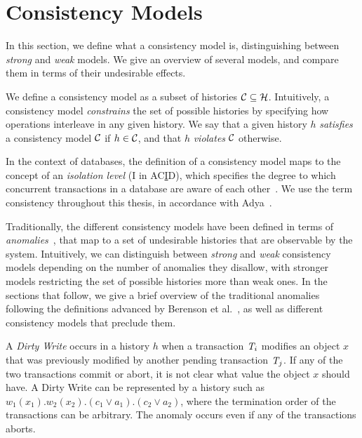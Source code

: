 \section{Consistency Models}

In this section, we define what a consistency model is, distinguishing between \emph{strong} and \emph{weak} models. We give an overview of several models, and compare them in terms of their undesirable effects.

We define a consistency model as a subset of histories $\mathcal{C} \subseteq \mathcal{H}$. Intuitively, a consistency model \emph{constrains} the set of possible histories by specifying how operations interleave in any given history. We say that a given history $h$ \emph{satisfies} a consistency model $\mathcal{C}$ if $h \in \mathcal{C}$, and that $h$ \emph{violates} $\mathcal{C}$ otherwise.

In the context of databases, the definition of a consistency model maps to the concept of an \emph{isolation level} (I in AC\underline{I}D), which specifies the degree to which concurrent transactions in a database are aware of each other~\citep{adya_thesis}. We use the term consistency throughout this thesis, in accordance with Adya~\citep{adya_thesis}.

Traditionally, the different consistency models have been defined in terms of \emph{anomalies}~\citep{sql-critique}, that map to a set of undesirable histories that are observable by the system. Intuitively, we can distinguish between \emph{strong} and \emph{weak} consistency models depending on the number of anomalies they disallow, with stronger models restricting the set of possible histories more than weak ones. In the sections that follow, we give a brief overview of the traditional anomalies following the definitions advanced by Berenson et al.~\citep{sql-critique}, as well as different consistency models that preclude them.

\begin{definition}
A \emph{Dirty Write} occurs in a history $h$ when a transaction $\mathit{T}_i$ modifies an object $x$ that was previously modified by another pending transaction $\mathit{T}_j$. If any of the two transactions commit or abort, it is not clear what value the object $x$ should have. A Dirty Write can be represented by a history such as $w_1(x_1).w_2(x_2).(c_1 \vee a_1).(c_2 \vee a_2)$, where the termination order of the transactions can be arbitrary. The anomaly occurs even if any of the transactions aborts.
\end{definition}

